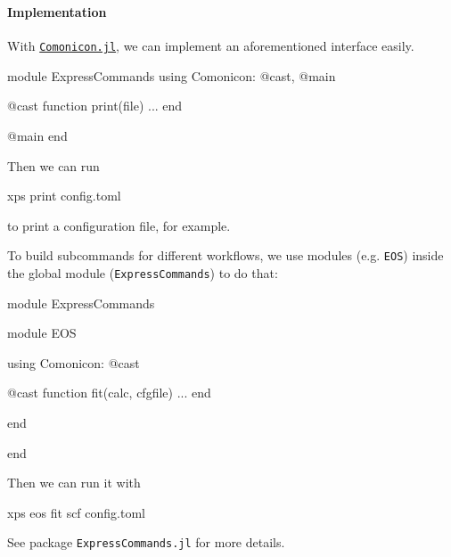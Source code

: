 \begin{frame}
    \frametitle{\subsecname}
    \framesubtitle{Implementation}

    With \href{https://github.com/comonicon/Comonicon.jl}{\texttt{Comonicon.jl}}, we can implement
    an aforementioned interface easily.

        {\scriptsize
            \begin{algorithmblock}
                \begin{juliaverbatim}
module ExpressCommands
using Comonicon: @cast, @main

@cast function print(file)
    ...
end

@main
end
                \end{juliaverbatim}
            \end{algorithmblock}
        }

    Then we can run

        {\scriptsize
            \begin{algorithmblock}
                \begin{juliaverbatim}
xps print config.toml
            \end{juliaverbatim}
            \end{algorithmblock}
        }

    to print a configuration file, for example.

    \framebreak

    To build subcommands for different workflows, we use modules (e.g. \texttt{EOS}) inside the global module
    (\texttt{ExpressCommands}) to do that:

    {\scriptsize
    \begin{algorithmblock}
        \begin{juliaverbatim}
module ExpressCommands

module EOS

using Comonicon: @cast

@cast function fit(calc, cfgfile)
    ...
end

end

end
        \end{juliaverbatim}
    \end{algorithmblock}
    }

    Then we can run it with

        {\scriptsize
            \begin{algorithmblock}
                \begin{juliaverbatim}
xps eos fit scf config.toml
    \end{juliaverbatim}
            \end{algorithmblock}
        }

    See package \texttt{ExpressCommands.jl} for more details.
\end{frame}



